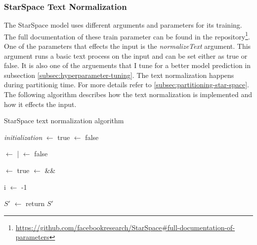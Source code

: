 \subsubsection{StarSpace Text Normalization}
\label{subsubsec:star-space-text-normalization}
The StarSpace model uses different arguments and parameters for its training. The full documentation of these train parameter can be found in the repository\footnote{\url{https://github.com/facebookresearch/StarSpace\#full-documentation-of-parameters}}. One of the parameters that effects the input is the \emph{normalizeText} argument. This argument runs a basic text process on the input and can be set either as true or false. It is also one of the arguements that I tune for a better model prediction in subsection \ref{subsec:hyperparameter-tuning}. The text normalization happens during partitionig time. For more details refer to \ref{subsec:partitioning-star-space}. The following algorithm describes how the text normalization is implemented and how it effects the input.

\begin{algorithm}[H]
	\caption{StarSpace text normalization algorithm}
	\label{alg:star-space-text-normalization}



	\SetAlgoLined

	\BlankLine\emph{initialization}\;
	\allNumeric $\leftarrow$ true\;
	\containsDigits $\leftarrow$ false\;

	\BlankLine

	{
		\containsDigits $\leftarrow$ \containsDigits | \;
		\allNumeric $\leftarrow$ false\;
	}

	\BlankLine

	\flattenCase $\leftarrow$ true\;
	\flattenNum $\leftarrow$ \allNumeric \&\& \containsDigits\;

	\BlankLine

	i $\leftarrow$ -1 \;


	$S\prime$ $\leftarrow$ \normalizedText\;
	return $S\prime$ \;
	\BlankLine
	\BlankLine
\end{algorithm}


